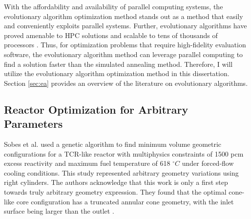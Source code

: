 With the affordability and availability of parallel computing systems, the 
evolutionary algorithm optimization method stands out as a method 
that easily and conveniently exploits parallel systems. 
Further, evolutionary algorithms have proved amenable to \gls{HPC} solutions and 
scalable to tens of thousands of processors \cite{kropaczek_constraint_2019}. 
Thus, for optimization problems that require high-fidelity evaluation software, 
the evolutionary algorithm method can leverage parallel computing to find a 
solution faster than the simulated annealing method.
Therefore, I will utilize the evolutionary algorithm optimization method in 
this dissertation.
Section \ref{sec:ea} provides an overview of the literature on evolutionary algorithms.

\subsection{Reactor Optimization for Arbitrary Parameters}
\label{sec:lit-review-reactor-arbitrary}
Sobes et al. \cite{sobes_artificial_2020} used a genetic algorithm to find 
minimum volume geometric configurations for a \gls{TCR}-like reactor with 
multiphysics constraints of 1500 pcm excess reactivity and maximum fuel 
temperature of 618 $^{\circ}C$ under forced-flow cooling conditions. 
This study represented arbitrary geometry variations using right cylinders.
The authors acknowledge that this work is only a first step towards truly 
arbitrary geometry expression. 
They found that the optimal cone-like core configuration has a truncated annular 
cone geometry, with the inlet surface being larger than the outlet 
\cite{sobes_artificial_2020}.

